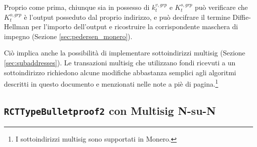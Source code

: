 Proprio come prima, chiunque sia in possesso di $k^{v,grp}_t$ e $K^{s,grp}_t$ può verificare che $K^{o,grp}_t$ è l'output posseduto dal proprio indirizzo, e può decifrare il termine Diffie-Hellman per l'importo dell'output e ricostruire la corrispondente maschera di impegno (Sezione \ref{sec:pedersen_monero}).

Ciò implica anche la possibilità di implementare sottoindirizzi multisig (Sezione \ref{sec:subaddresses}). Le transazioni multisig che utilizzano fondi ricevuti a un sottoindirizzo richiedono alcune modifiche abbastanza semplici agli algoritmi descritti in questo documento e menzionati nelle note a piè di pagina.\footnote{I sottoindirizzi multisig sono supportati in Monero.}


\subsection{{\tt RCTTypeBulletproof2} con Multisig N-su-N}
\label{sec:rcttypebulletproof2-multisig}

